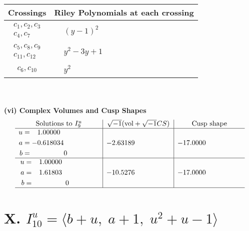 \documentclass[1p]{elsarticle_modified}
\theoremstyle{definition}
\newcommand{\I}{\sqrt{-1}}
\begin{document}
\begin{tabular}{m{50pt}|m{274pt}}
Crossings & \hspace{64pt}Riley Polynomials at each crossing \\
\hline $$\begin{aligned}c_{1},c_{2},c_{3}\\c_{4},c_{7}\end{aligned}$$&$\begin{aligned}
&(y-1)^2
\end{aligned}$\\
\hline $$\begin{aligned}c_{5},c_{8},c_{9}\\c_{11},c_{12}\end{aligned}$$&$\begin{aligned}
&y^2-3 y+1
\end{aligned}$\\
\hline $$\begin{aligned}c_{6},c_{10}\end{aligned}$$&$\begin{aligned}
&y^2
\end{aligned}$\\
\hline
\end{tabular}\\~\\
\newpage\flushleft \textbf{(vi) Complex Volumes and Cusp Shapes}
$$\begin{array}{c|c|c}  
\text{Solutions to }I^u_{9}& \I (\text{vol} + \sqrt{-1}CS) & \text{Cusp shape}\\
 \hline 
\begin{aligned}
u &= \phantom{-}1.00000\phantom{ +0.000000I} \\
a &= -0.618034\phantom{ +0.000000I} \\
b &= \phantom{-0.000000 } 0\end{aligned}
 & -2.63189\phantom{ +0.000000I} & -17.0000\phantom{ +0.000000I} \\ \hline\begin{aligned}
u &= \phantom{-}1.00000\phantom{ +0.000000I} \\
a &= \phantom{-}1.61803\phantom{ +0.000000I} \\
b &= \phantom{-0.000000 } 0\end{aligned}
 & -10.5276\phantom{ +0.000000I} & -17.0000\phantom{ +0.000000I}\\
 \hline 
 \end{array}$$\newpage\newpage\renewcommand{\arraystretch}{1}
\centering \section*{X. $I^u_{10}= \langle b+u,\;a+1,\;u^2+u-1 \rangle$}
\end{document}
